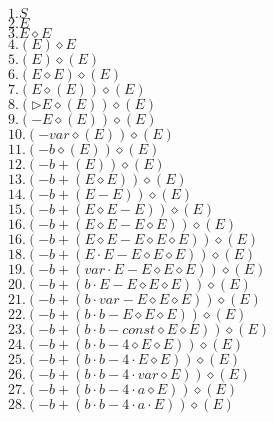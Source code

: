\documentclass{article}
\begin{document}
\begin{enumerate}
		\begin{multicols}{2}
				$1. S$\\
				$2. E$ \\
				$3. E \diamond E$ \\
				$4. (E) \diamond E$ \\
				$5. (E) \diamond (E)$ \\
				$6. (E \diamond E) \diamond (E)$ \\
				$7. (E \diamond (E)) \diamond (E)$ \\  	
				$8. (\rhd E \diamond (E)) \diamond (E)$\\
				$9. (- E \diamond (E)) \diamond (E)$\\
				$10. (- var \diamond (E)) \diamond (E)$\\
				$11. (- b \diamond (E)) \diamond (E)$\\
				$12. (- b + (E)) \diamond (E)$ \\	
				$13. (- b + (E \diamond E)) \diamond (E)$ \\ 	
				$14. (- b + (E - E)) \diamond (E)$ \\
				$15. (- b + (E \diamond E - E)) \diamond (E)$ \\
				$16. (- b + (E \diamond E - E \diamond E)) \diamond (E)$ \\
				$16. (- b + (E \diamond E - E \diamond E \diamond E)) \diamond (E)$\\ 	
				$18. (- b + (E \cdot E - E \diamond E \diamond E)) \diamond (E)$ \\
				$19. (- b + (var \cdot E - E \diamond E \diamond E)) \diamond (E)$ \\ 
				$20. (- b + (b \cdot E - E \diamond E \diamond E)) \diamond (E)$  \\
				$21. (- b + (b \cdot var - E \diamond E \diamond E)) \diamond (E)$ \\
				$22. (- b + (b \cdot b - E \diamond E \diamond E)) \diamond (E)$ \\
				$23. (- b + (b \cdot b - const \diamond E \diamond E)) \diamond (E)$ \\
				$24. (- b + (b \cdot b - 4 \diamond E \diamond E)) \diamond (E)$ \\
				$25. (- b + (b \cdot b - 4 \cdot E \diamond E)) \diamond (E)$ \\
				$26. (- b + (b \cdot b - 4 \cdot var \diamond E)) \diamond (E)$ \\
				$27. (- b + (b \cdot b - 4 \cdot a \diamond E)) \diamond (E)$ \\
				$28. (- b + (b \cdot b - 4 \cdot a \cdot E)) \diamond (E)$ \\

\end{multicols}
\end{enumerate}
\end{document}
